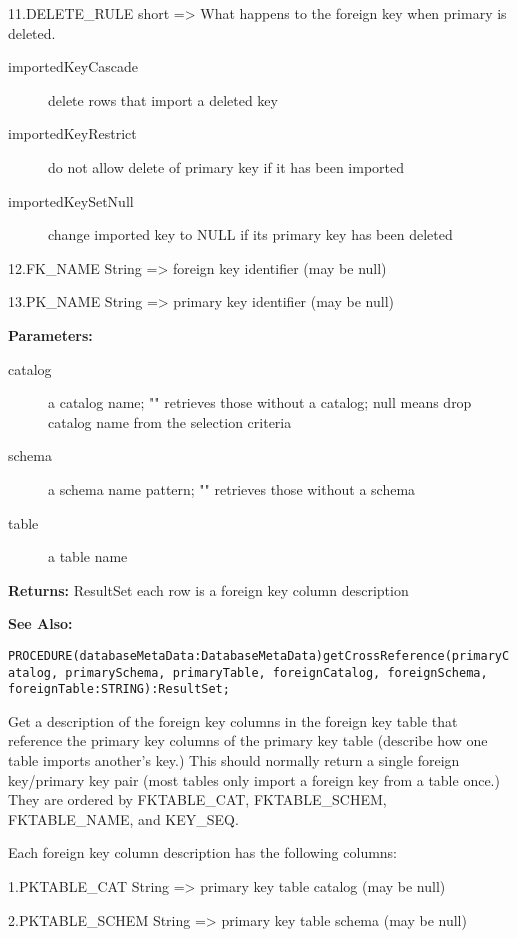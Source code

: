 11.DELETE\_RULE short => What happens to the foreign key when primary is deleted. 
\begin{description}
\item[importedKeyCascade] delete rows that import a deleted key 
\item[importedKeyRestrict] do not allow delete of primary key if it has been imported 
\item[importedKeySetNull] change imported key to NULL if its primary key has been deleted 
\end{description}

12.FK\_NAME String => foreign key identifier (may be null) 

13.PK\_NAME String => primary key identifier (may be null) 


{\bf Parameters: }
\begin{description}
\item[catalog] a catalog name; "" retrieves those without a catalog; null means drop catalog name from the selection criteria 
\item[schema] a schema name pattern; "" retrieves those without a schema 
\item[table] a table name 
\end{description}

{\bf Returns: } 
ResultSet each row is a foreign key column description 

{\bf See Also:} 




\verb'PROCEDURE(databaseMetaData:DatabaseMetaData)getCrossReference(primaryCatalog, primarySchema, primaryTable, foreignCatalog, foreignSchema, foreignTable:STRING):ResultSet;'



Get a description of the foreign key columns in the foreign key table that reference the primary key columns of the primary key table (describe how one table imports another's key.) This should normally return a single foreign key/primary key pair (most tables only import a foreign key from a table once.) They are ordered by FKTABLE\_CAT, FKTABLE\_SCHEM, FKTABLE\_NAME, and KEY\_SEQ. 

Each foreign key column description has the following columns: 

1.PKTABLE\_CAT String => primary key table catalog (may be null) 

2.PKTABLE\_SCHEM String => primary key table schema (may be null) 

